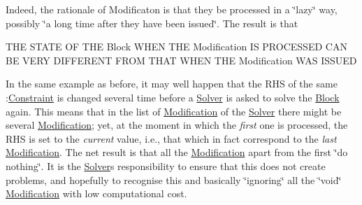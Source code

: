 \begin{DoxyEnumerate}
Indeed, the rationale of Modificaton is that they be processed in a \char`\"{}lazy\char`\"{} way, possibly \char`\"{}a long time after they have been issued\char`\"{}. The result is that \begin{DoxyVerb}THE STATE OF THE Block WHEN THE Modification IS PROCESSED CAN
BE VERY DIFFERENT FROM THAT WHEN THE Modification WAS ISSUED
\end{DoxyVerb}


In the same example as before, it may well happen that the R\+HS of the same \+:\mbox{\hyperlink{class_s_m_spp__di__unipi__it_1_1_constraint}{Constraint}} is changed several time before a \mbox{\hyperlink{class_s_m_spp__di__unipi__it_1_1_solver}{Solver}} is asked to solve the \mbox{\hyperlink{class_s_m_spp__di__unipi__it_1_1_block}{Block}} again. This means that in the list of \mbox{\hyperlink{class_s_m_spp__di__unipi__it_1_1_modification}{Modification}} of the \mbox{\hyperlink{class_s_m_spp__di__unipi__it_1_1_solver}{Solver}} there might be several \mbox{\hyperlink{class_s_m_spp__di__unipi__it_1_1_modification}{Modification}}; yet, at the moment in which the {\itshape first} one is processed, the R\+HS is set to the {\itshape current} value, i.\+e., that which in fact correspond to the {\itshape last} \mbox{\hyperlink{class_s_m_spp__di__unipi__it_1_1_modification}{Modification}}. The net result is that all the \mbox{\hyperlink{class_s_m_spp__di__unipi__it_1_1_modification}{Modification}} apart from the first \char`\"{}do
   nothing\char`\"{}. It is the \mbox{\hyperlink{class_s_m_spp__di__unipi__it_1_1_solver}{Solver}}\textquotesingle{}s responsibility to ensure that this does not create problems, and hopefully to recognise this and basically \char`\"{}ignoring\char`\"{} all the \char`\"{}void\char`\"{} \mbox{\hyperlink{class_s_m_spp__di__unipi__it_1_1_modification}{Modification}} with low computational cost.

\end{DoxyEnumerate}
